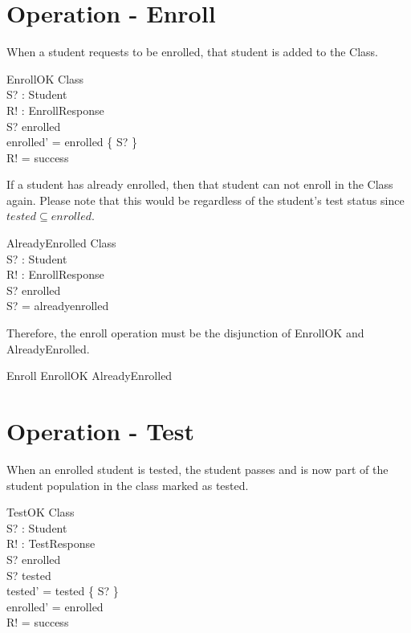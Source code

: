 \documentclass[letterpaper,11pt]{article}
\begin{document}
    \begin{zed}
    [Class' | enrolled' = 0 ]
    \end{zed}

\section*{Operation - Enroll}

When a student requests to be enrolled, that student is added to the Class.

    \begin{schema}{EnrollOK}
    \Delta Class \\
    S? : Student \\
    R! : EnrollResponse \\
    \where
    S? \notin enrolled \\
    enrolled' = enrolled \union \left\{ S? \right\} \\
    R! = success \\
    \end{schema}

If a student has already enrolled, then that student can not enroll in the
Class again.  Please note that this would be regardless of the student's
test status since $tested \subseteq enrolled$.

    \begin{schema}{AlreadyEnrolled}
    \Xi Class \\
    S? : Student \\
    R! : EnrollResponse \\
    \where
    S? \in enrolled \\
    S? = alreadyenrolled \\
    \end{schema}

Therefore, the enroll operation must be the disjunction of EnrollOK and
AlreadyEnrolled.

    \begin{zed}
    Enroll \triangleq EnrollOK \vee AlreadyEnrolled
    \end{zed}

\section*{Operation - Test}

When an enrolled student is tested, the student passes and is now part of the
student population in the class marked as tested.

    \begin{schema}{TestOK}
    \Delta Class \\
    S? : Student \\
    R! : TestResponse \\
    \where
    S? \in enrolled \\
    S? \notin tested \\
    tested' = tested \union \left\{ S? \right\} \\
    enrolled' = enrolled \\
    R! = success \\
    \end{schema}
\end{document}

